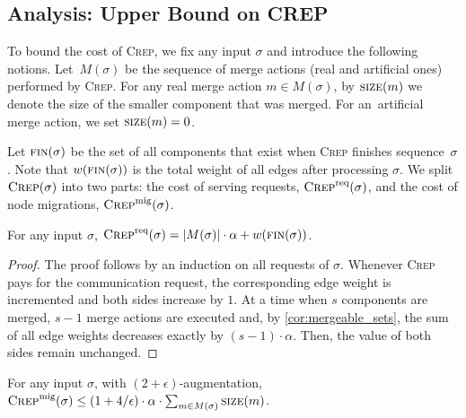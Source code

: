 \documentclass{siamart190516}
\newcommand{\CREP}{\textsc{Crep}\xspace}
\newcommand{\CREPreq}{\CREP^\textnormal{req}}
\newcommand{\CREPmig}{\CREP^\textnormal{mig}}
\newcommand{\eps}{\ensuremath{\epsilon}}
\newcommand{\final}{\textsc{fin}}
\newcommand{\size}{\textsc{size}}
\begin{document}
\subsection{Analysis: Upper Bound on CREP}
\label{sec:crep_upper}

To bound the cost of \CREP, we fix any input $\sigma$ and introduce the following 
notions. Let~$M(\sigma)$ be the sequence of merge actions 
(real and artificial ones) performed by \CREP. 
For any real merge action $m \in M(\sigma)$, by
$\size(m)$ we denote the size of the smaller component that was
merged. For an~artificial merge action, we set $\size(m) = 0$.

Let $\final(\sigma)$ be the set of all components that exist when \CREP finishes
sequence~$\sigma$. Note that $w(\final(\sigma))$ is the total weight of all
edges after processing $\sigma$. We split 
$\CREP(\sigma)$ into two parts: the cost of serving requests, $\CREPreq(\sigma)$, 
and the cost of node migrations, $\CREPmig(\sigma)$. 

\begin{lemma}
\label{lem:crep_req}
For any input $\sigma$, $\CREPreq(\sigma) = |M(\sigma)| \cdot \alpha + w(\final(\sigma))$.
\end{lemma}

\begin{proof}
The proof follows by an induction on all requests of $\sigma$. Whenever \CREP
pays for the communication request, the corresponding edge weight is incremented
and both sides increase by $1$. At a time when $s$ components are merged, $s-1$
merge actions are executed and, by \cref{cor:mergeable_sets}, the sum of all
edge weights decreases exactly by $(s-1) \cdot \alpha$. Then, the value of both
sides remain unchanged.
\end{proof}

\begin{lemma}
\label{lem:crep_mig}
For any input $\sigma$, with $(2+\eps)$-augmentation, 
$\CREPmig(\sigma) \leq (1+4/\eps) \cdot \alpha \cdot \sum_{m \in M(\sigma)} \size(m)$.
\end{lemma}
\end{document}
